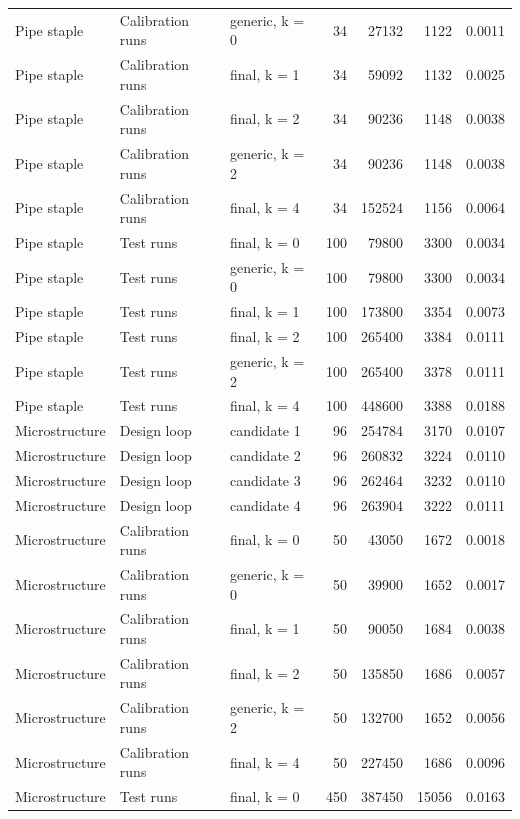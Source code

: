 \begin{table}
\begin{tabular}[t]{lllrrrr}
Pipe staple & Calibration runs & generic, k = 0 & 34 & 27132 & 1122 & 0.0011\\
Pipe staple & Calibration runs & final, k = 1 & 34 & 59092 & 1132 & 0.0025\\
Pipe staple & Calibration runs & final, k = 2 & 34 & 90236 & 1148 & 0.0038\\
\addlinespace
Pipe staple & Calibration runs & generic, k = 2 & 34 & 90236 & 1148 & 0.0038\\
Pipe staple & Calibration runs & final, k = 4 & 34 & 152524 & 1156 & 0.0064\\
Pipe staple & Test runs & final, k = 0 & 100 & 79800 & 3300 & 0.0034\\
Pipe staple & Test runs & generic, k = 0 & 100 & 79800 & 3300 & 0.0034\\
Pipe staple & Test runs & final, k = 1 & 100 & 173800 & 3354 & 0.0073\\
\addlinespace
Pipe staple & Test runs & final, k = 2 & 100 & 265400 & 3384 & 0.0111\\
Pipe staple & Test runs & generic, k = 2 & 100 & 265400 & 3378 & 0.0111\\
Pipe staple & Test runs & final, k = 4 & 100 & 448600 & 3388 & 0.0188\\
Microstructure & Design loop & candidate 1 & 96 & 254784 & 3170 & 0.0107\\
Microstructure & Design loop & candidate 2 & 96 & 260832 & 3224 & 0.0110\\
\addlinespace
Microstructure & Design loop & candidate 3 & 96 & 262464 & 3232 & 0.0110\\
Microstructure & Design loop & candidate 4 & 96 & 263904 & 3222 & 0.0111\\
Microstructure & Calibration runs & final, k = 0 & 50 & 43050 & 1672 & 0.0018\\
Microstructure & Calibration runs & generic, k = 0 & 50 & 39900 & 1652 & 0.0017\\
Microstructure & Calibration runs & final, k = 1 & 50 & 90050 & 1684 & 0.0038\\
\addlinespace
Microstructure & Calibration runs & final, k = 2 & 50 & 135850 & 1686 & 0.0057\\
Microstructure & Calibration runs & generic, k = 2 & 50 & 132700 & 1652 & 0.0056\\
Microstructure & Calibration runs & final, k = 4 & 50 & 227450 & 1686 & 0.0096\\
Microstructure & Test runs & final, k = 0 & 450 & 387450 & 15056 & 0.0163\\

\end{tabular}
\end{table}
